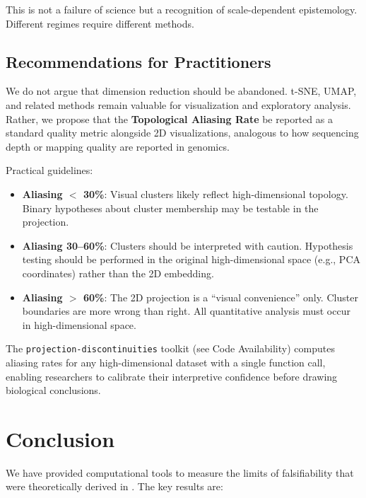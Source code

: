\documentclass[12pt]{article}
\begin{document}
This is not a failure of science but a recognition of scale-dependent epistemology. Different regimes require different methods.

\subsection{Recommendations for Practitioners}

We do not argue that dimension reduction should be abandoned. t-SNE, UMAP, and related methods remain valuable for visualization and exploratory analysis. Rather, we propose that the \textbf{Topological Aliasing Rate} be reported as a standard quality metric alongside 2D visualizations, analogous to how sequencing depth or mapping quality are reported in genomics.

Practical guidelines:
\begin{itemize}
    \item \textbf{Aliasing $<$ 30\%}: Visual clusters likely reflect high-dimensional topology. Binary hypotheses about cluster membership may be testable in the projection.
    \item \textbf{Aliasing 30--60\%}: Clusters should be interpreted with caution. Hypothesis testing should be performed in the original high-dimensional space (e.g., PCA coordinates) rather than the 2D embedding.
    \item \textbf{Aliasing $>$ 60\%}: The 2D projection is a ``visual convenience'' only. Cluster boundaries are more wrong than right. All quantitative analysis must occur in high-dimensional space.
\end{itemize}

The \texttt{projection-discontinuities} toolkit (see Code Availability) computes aliasing rates for any high-dimensional dataset with a single function call, enabling researchers to calibrate their interpretive confidence before drawing biological conclusions.

\section{Conclusion}

We have provided computational tools to measure the limits of falsifiability that were theoretically derived in \cite{todd2025limits}. The key results are:
\end{document}
